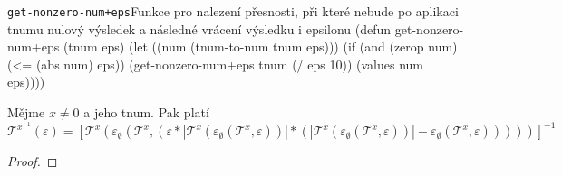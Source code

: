 \begin{lispcode}{\texttt{get-nonzero-num+eps}}{Funkce pro nalezení přesnosti, při které nebude po aplikaci tnumu nulový výsledek a následné vrácení výsledku i epsilonu}
(\textcolor{funkcionalni}{defun} \textcolor{pojmenovan}{get-nonzero-num+eps} (tnum eps)
  (\textcolor{vedlejsi}{let} ((num (\textcolor{moje}{tnum-to-num} tnum eps)))
    (\textcolor{funkcionalni}{if} (\textcolor{funkcionalni}{and} (\textcolor{funkcionalni}{zerop} num) (\textcolor{matematicke}{<=} (\textcolor{matematicke}{abs} num) eps))
      (\textcolor{moje}{get-nonzero-num+eps} tnum (\textcolor{matematicke}{/} eps 10))
      (\textcolor{matematicke}{values} num eps))))
\end{lispcode}

\begin{theorem}\label{hyp:prevraceni_tnumu}
Mějme $x \neq 0$ a jeho tnum. Pak platí
\begin{equation}
\mathcal{T}^{x^{-1}}(\varepsilon)=\left[\mathcal{T}^x(\varepsilon_\emptyset(\mathcal{T}^x, (\varepsilon*|\mathcal{T}^x(\varepsilon_\emptyset(\mathcal{T}^x, \varepsilon))|*(|\mathcal{T}^x(\varepsilon_\emptyset(\mathcal{T}^x, \varepsilon))|-\varepsilon_\emptyset(\mathcal{T}^x, \varepsilon)))))\right]^{-1}
\end{equation}
\begin{proof}


\end{proof}
\end{theorem}
